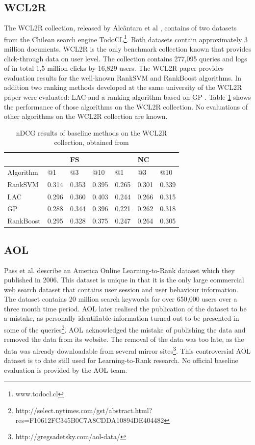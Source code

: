 \subsection{WCL2R}
The WCL2R collection, released by Alc{\^a}ntara et al \cite{Alcantara2010}, contains of two datasets from the Chilean search engine TodoCL\footnote{www.todocl.cl}. Both datasets contain approximately 3 million documents. WCL2R is the only benchmark collection known that provides click-through data on user level. The collection contains 277,095 queries and logs of in total 1,5 million clicks by 16,829 users. The WCL2R paper provides evaluation results for the well-known Rank\ac{SVM} \cite{Herbrich1999,Joachims2002} and RankBoost \cite{Freund2003} algorithms. In addition two ranking methods developed at the same university of the WCL2R paper were evaluated: LAC \cite{Veloso2008} and a ranking algorithm based on \ac{GP} \cite{DeAlmeida2007}. Table \ref{tab:results_WCL2R} shows the performance of those algorithms on the WCL2R collection. No evaluations of other algorithms on the WCL2R collection are known.

\begin{table}[!h]
\begin{tabular}{l|lll|lll}
 &  & FS &  &  & NC &  \\ 
\hline
Algorithm & @1 & @3 & @10 & @1 & @3 & @10 \\ 
\hline
RankSVM & 0.314 & 0.353 & 0.395 & 0.265 & 0.301 & 0.339 \\ 
LAC & 0.296 & 0.360 & 0.403 & 0.244 & 0.266 & 0.315 \\ 
GP & 0.288 & 0.344 & 0.396 & 0.221 & 0.262 & 0.318 \\ 
RankBoost & 0.295 & 0.328 & 0.375 & 0.247 & 0.264 & 0.305 \\ 
\end{tabular}
\caption{\acs{nDCG} results of baseline methods on the WCL2R collection, obtained from \cite{Alcantara2010}}
\label{tab:results_WCL2R}
\end{table}

\subsection{AOL}
Pass et al. \cite{Pass2006} describe an America Online Learning-to-Rank dataset which they published in 2006. This dataset is unique in that it is the only large commercial web search dataset that contains user session and user behaviour information. The dataset contains 20 million search keywords for over 650,000 users over a three month time period. AOL later realised the publication of the dataset to be a mistake, as personally identifiable information turned out to be presented in some of the queries\footnote{http://select.nytimes.com/gst/abstract.html?res=F10612FC345B0C7A8CDDA10894DE404482}. AOL acknowledged the mistake of publishing the data and removed the data from its website. The removal of the data was too late, as the data was already downloadable from several mirror sites\footnote{http://gregsadetsky.com/aol-data/}. This controversial AOL dataset is to date still used for Learning-to-Rank research. No official baseline evaluation is provided by the AOL team.

